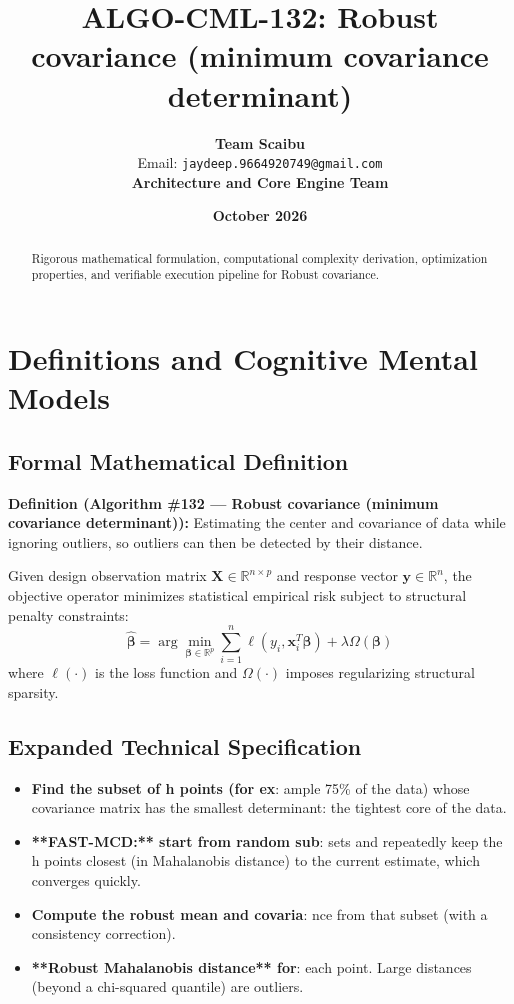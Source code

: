 \documentclass[11pt,a4paper]{article}
\title{\textbf{ALGO-CML-132: Robust covariance (minimum covariance determinant)}}
\author{\textbf{Team Scaibu} \\ \small Email: \texttt{jaydeep.9664920749@gmail.com} \\ \small \textbf{Architecture and Core Engine Team}}
\date{\textbf{October 2026}}
\theoremstyle{definition}
\begin{document}
\maketitle

\begin{abstract}
Rigorous mathematical formulation, computational complexity derivation, optimization properties, and verifiable execution pipeline for Robust covariance.
\end{abstract}

\section{Definitions and Cognitive Mental Models}

\subsection{Formal Mathematical Definition}
\textbf{Definition (Algorithm \#132 --- Robust covariance (minimum covariance determinant)):}
Estimating the center and covariance of data while ignoring outliers, so outliers can then be detected by their distance.

Given design observation matrix $\mathbf{X} \in \mathbb{R}^{n \times p}$ and response vector $\mathbf{y} \in \mathbb{R}^n$, the objective operator minimizes statistical empirical risk subject to structural penalty constraints:
\begin{equation}
\hat{\boldsymbol{\beta}} = \arg\min_{\boldsymbol{\beta} \in \mathbb{R}^p} \sum_{i=1}^n \ell(y_i, \mathbf{x}_i^T \boldsymbol{\beta}) + \lambda \Omega(\boldsymbol{\beta})
\end{equation}
where $\ell(\cdot)$ is the loss function and $\Omega(\cdot)$ imposes regularizing structural sparsity.

\subsection{Expanded Technical Specification}
\begin{itemize}
\item \textbf{Find the subset of h points (for ex}: ample 75\% of the data) whose covariance matrix has the smallest determinant: the tightest core of the data.
\item \textbf{**FAST-MCD:** start from random sub}: sets and repeatedly keep the h points closest (in Mahalanobis distance) to the current estimate, which converges quickly.
\item \textbf{Compute the robust mean and covaria}: nce from that subset (with a consistency correction).
\item \textbf{**Robust Mahalanobis distance** for}:  each point. Large distances (beyond a chi-squared quantile) are outliers.
\end{itemize}
\end{document}
